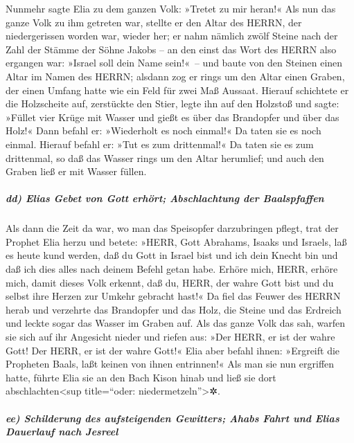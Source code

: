 Nunmehr sagte Elia zu dem ganzen Volk: »Tretet zu mir
heran!« Als nun das ganze Volk zu ihm getreten war, stellte er den Altar
des HERRN, der niedergerissen worden war, wieder her; er
nahm nämlich zwölf Steine nach der Zahl der Stämme der Söhne Jakobs --
an den einst das Wort des HERRN also ergangen war: »Israel soll dein
Name sein!«~-- und baute von den Steinen einen Altar im
Namen des HERRN; alsdann zog er rings um den Altar einen Graben, der
einen Umfang hatte wie ein Feld für zwei Maß Aussaat.
Hierauf schichtete er die Holzscheite auf, zerstückte den
Stier, legte ihn auf den Holzstoß und sagte: »Füllet vier
Krüge mit Wasser und gießt es über das Brandopfer und über das Holz!«
Dann befahl er: »Wiederholt es noch einmal!« Da taten sie es noch
einmal. Hierauf befahl er: »Tut es zum drittenmal!« Da taten sie es zum
drittenmal, so daß das Wasser rings um den Altar
herumlief; und auch den Graben ließ er mit Wasser füllen.

\hypertarget{dd-elias-gebet-von-gott-erhuxf6rt-abschlachtung-der-baalspfaffen}{%
\subparagraph{dd) Elias Gebet von Gott erhört; Abschlachtung der
Baalspfaffen}\label{dd-elias-gebet-von-gott-erhuxf6rt-abschlachtung-der-baalspfaffen}}

Als dann die Zeit da war, wo man das Speisopfer
darzubringen pflegt, trat der Prophet Elia herzu und betete: »HERR, Gott
Abrahams, Isaaks und Israels, laß es heute kund werden, daß du Gott in
Israel bist und ich dein Knecht bin und daß ich dies alles nach deinem
Befehl getan habe. Erhöre mich, HERR, erhöre mich, damit
dieses Volk erkennt, daß du, HERR, der wahre Gott bist und du selbst
ihre Herzen zur Umkehr gebracht hast!« Da fiel das Feuwer
des HERRN herab und verzehrte das Brandopfer und das Holz, die Steine
und das Erdreich und leckte sogar das Wasser im Graben auf.
Als das ganze Volk das sah, warfen sie sich auf ihr
Angesicht nieder und riefen aus: »Der HERR, er ist der wahre Gott! Der
HERR, er ist der wahre Gott!« Elia aber befahl ihnen:
»Ergreift die Propheten Baals, laßt keinen von ihnen entrinnen!« Als man
sie nun ergriffen hatte, führte Elia sie an den Bach Kison hinab und
ließ sie dort abschlachten\textless sup title=``oder:
niedermetzeln''\textgreater✲.

\hypertarget{ee-schilderung-des-aufsteigenden-gewitters-ahabs-fahrt-und-elias-dauerlauf-nach-jesreel}{%
\subparagraph{ee) Schilderung des aufsteigenden Gewitters; Ahabs Fahrt
und Elias Dauerlauf nach
Jesreel}\label{ee-schilderung-des-aufsteigenden-gewitters-ahabs-fahrt-und-elias-dauerlauf-nach-jesreel}}


